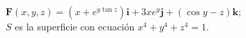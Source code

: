 \item $\mathbf{F}(x, y, z) = (x + e^{y \tan z})\mathbf{i} + 3xe^y\mathbf{j} + (\cos y - z)\mathbf{k}$;\\
    $S$ es la superficie con ecuación $x^4 + y^4 + z^4 = 1$.
